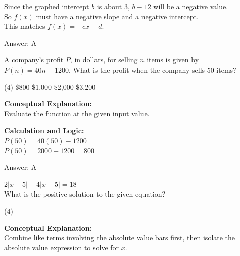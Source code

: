 \documentclass[11pt,paper=a4,answers]{exam}
\begin{document}
\begin{questions}
\begin{solution}
\vspace{10pt}

Since the graphed intercept $b$ is about 3, $b - 12$ will be a negative value. \\
So $f(x)$ must have a negative slope and a negative intercept. \\
This matches $f(x) = -cx - d$.

\vspace{25pt}

Answer: \colorbox{yellow!100}{A}
\end{solution}

\vspace{40pt}

\question
A company's profit $P$, in dollars, for selling $n$ items is given by $P(n) = 40n - 1200$. What is the profit when the company sells 50 items?
\begin{tasks}(4)
    \task \$800
    \task \$1,000
    \task \$2,000
    \task \$3,200
\end{tasks}

\begin{solution}
\textbf{Conceptual Explanation:} \\
Evaluate the function at the given input value.

\vspace{20pt}

\textbf{Calculation and Logic:} \\
$P(50) = 40(50) - 1200$ \\
$P(50) = 2000 - 1200 = 800$

\vspace{25pt}

Answer: \colorbox{yellow!100}{A}
\end{solution}

\vspace{40pt}

\question
$2|x - 5| + 4|x - 5| = 18$ \\
What is the positive solution to the given equation?
\begin{tasks}(4)
\end{tasks}

\begin{solution}
\textbf{Conceptual Explanation:} \\
Combine like terms involving the absolute value bars first, then isolate the absolute value expression to solve for $x$.


\end{solution}
\end{questions}
\end{document}
